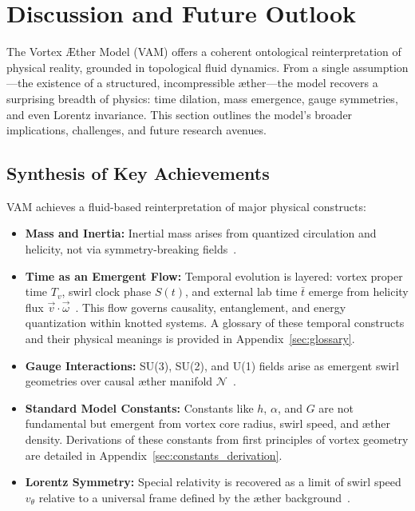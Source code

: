 \documentclass[preprint]{revtex4-2}
\begin{document}
\section{Discussion and Future Outlook}
    The Vortex \AE{}ther Model (VAM) offers a coherent ontological reinterpretation of physical reality, grounded in topological fluid dynamics. From a single assumption—the existence of a structured, incompressible æther—the model recovers a surprising breadth of physics: time dilation, mass emergence, gauge symmetries, and even Lorentz invariance. This section outlines the model’s broader implications, challenges, and future research avenues.

    \subsection{Synthesis of Key Achievements}
    VAM achieves a fluid-based reinterpretation of major physical constructs:

    \begin{itemize}
        \item \textbf{Mass and Inertia:} Inertial mass arises from quantized circulation and helicity, not via symmetry-breaking fields~\cite{kleckner2013creation, volovik2003universe}.
        \item \textbf{Time as an Emergent Flow:} Temporal evolution is layered: vortex proper time $T_v$, swirl clock phase $S(t)$, and external lab time $\bar{t}$ emerge from helicity flux $\vec{v} \cdot \vec{\omega}$~\cite{volovik2003universe, ranada1990topological}. This flow governs causality, entanglement, and energy quantization within knotted systems. A glossary of these temporal constructs and their physical meanings is provided in Appendix~\ref{sec:glossary}.
        \item \textbf{Gauge Interactions:} SU(3), SU(2), and U(1) fields arise as emergent swirl geometries over causal æther manifold $\mathcal{N}$~\cite{moffatt1969knottedness}.
        \item \textbf{Standard Model Constants:} Constants like $h$, $\alpha$, and $G$ are not fundamental but emergent from vortex core radius, swirl speed, and æther density.     Derivations of these constants from first principles of vortex geometry are detailed in Appendix~\ref{sec:constants_derivation}.
        \item \textbf{Lorentz Symmetry:} Special relativity is recovered as a limit of swirl speed $v_\theta$ relative to a universal frame defined by the æther background~\cite{volovik2003universe}.
    \end{itemize}
\end{document}
